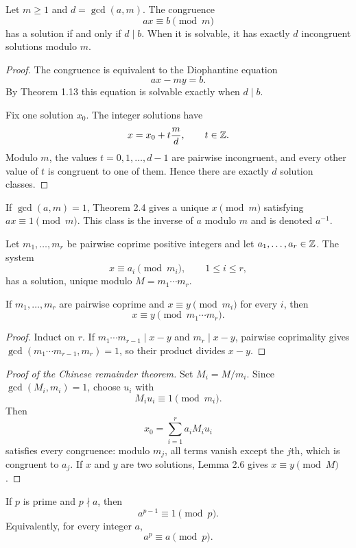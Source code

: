 \begin{thm}
Let $m\ge1$ and $d=\gcd(a,m)$.  The congruence
\[
 ax\equiv b\pmod m
\]
has a solution if and only if $d\mid b$.  When it is solvable, it has exactly $d$ incongruent solutions modulo $m$.
\end{thm}
\begin{proof}
The congruence is equivalent to the Diophantine equation
\[
 ax-my=b.
\]
By Theorem 1.13 this equation is solvable exactly when $d\mid b$.

Fix one solution $x_0$.  The integer solutions have
\[
 x=x_0+t\frac md,\qquad t\in\mathbb{Z}.
\]
Modulo $m$, the values $t=0,1,\ldots,d-1$ are pairwise incongruent, and every other value of $t$ is congruent to one of them.  Hence there are exactly $d$ solution classes.
\end{proof}

\begin{de}
If $\gcd(a,m)=1$, Theorem 2.4 gives a unique $x\pmod m$ satisfying $ax\equiv1\pmod m$.  This class is the inverse of $a$ modulo $m$ and is denoted $a^{-1}$.
\end{de}

\begin{thm}
Let $m_1,\ldots,m_r$ be pairwise coprime positive integers and let $a_1,\ldots,a_r\in\mathbb{Z}$.  The system
\[
 x\equiv a_i\pmod{m_i},\qquad 1\le i\le r,
\]
has a solution, unique modulo $M=m_1\cdots m_r$.
\end{thm}

\begin{lem}
If $m_1,\ldots,m_r$ are pairwise coprime and $x\equiv y\pmod{m_i}$ for every $i$, then
\[
 x\equiv y\pmod{m_1\cdots m_r}.
\]
\end{lem}
\begin{proof}
Induct on $r$.  If $m_1\cdots m_{r-1}\mid x-y$ and $m_r\mid x-y$, pairwise coprimality gives
$\gcd(m_1\cdots m_{r-1},m_r)=1$, so their product divides $x-y$.
\end{proof}

\begin{proof}[Proof of the Chinese remainder theorem]
Set $M_i=M/m_i$.  Since $\gcd(M_i,m_i)=1$, choose $u_i$ with
\[
 M_i u_i\equiv1\pmod{m_i}.
\]
Then
\[
 x_0=\sum_{i=1}^r a_iM_i u_i
\]
satisfies every congruence: modulo $m_j$, all terms vanish except the $j$th, which is congruent to $a_j$.  If $x$ and $y$ are two solutions, Lemma 2.6 gives $x\equiv y\pmod M$.
\end{proof}

\begin{thm}
If $p$ is prime and $p\nmid a$, then
\[
 a^{p-1}\equiv1\pmod p.
\]
Equivalently, for every integer $a$,
\[
 a^p\equiv a\pmod p.
\]
\end{thm}

